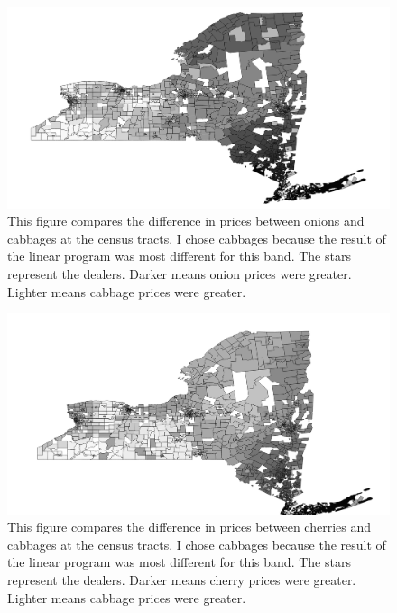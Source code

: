 \documentclass{report}
\begin{document}
\begin{figure}
\centering
\begin{framed}
\includegraphics[scale=.50]{stores_243_49}
\caption{This figure compares the difference in prices between onions and cabbages at the census tracts. I chose cabbages because the result of the linear program was most different for this band. The stars represent the dealers. Darker means onion prices were greater. Lighter means cabbage prices were greater.}
\label{fig:stores_243_49}
\end{framed}
\end{figure}

\begin{figure}
\centering
\begin{framed}
\includegraphics[scale=.50]{stores_243_66}
\caption{This figure compares the difference in prices between cherries and cabbages at the census tracts. I chose cabbages because the result of the linear program was most different for this band. The stars represent the dealers. Darker means cherry prices were greater. Lighter means cabbage prices were greater.}
\label{fig:stores_243_66}
\end{framed}
\end{figure}
\end{document}
